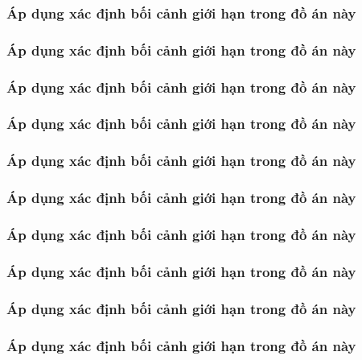 \subsubsection{Áp dụng xác định bối cảnh giới hạn trong đồ án này}

\subsubsection{Áp dụng xác định bối cảnh giới hạn trong đồ án này}

\subsubsection{Áp dụng xác định bối cảnh giới hạn trong đồ án này}

\subsubsection{Áp dụng xác định bối cảnh giới hạn trong đồ án này}

\subsubsection{Áp dụng xác định bối cảnh giới hạn trong đồ án này}

\subsubsection{Áp dụng xác định bối cảnh giới hạn trong đồ án này}

\subsubsection{Áp dụng xác định bối cảnh giới hạn trong đồ án này}

\subsubsection{Áp dụng xác định bối cảnh giới hạn trong đồ án này}

\subsubsection{Áp dụng xác định bối cảnh giới hạn trong đồ án này}

\subsubsection{Áp dụng xác định bối cảnh giới hạn trong đồ án này}

